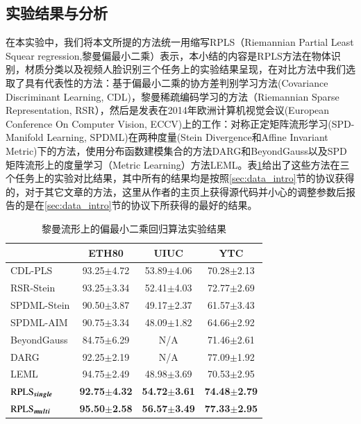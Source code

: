 \subsection{实验结果与分析}
\label{sec:RPLS_exp_result_analysis}
在本实验中，我们将本文所提的方法统一用缩写RPLS（Riemannian Partial Least Squear regression,黎曼偏最小二乘）表示，本小结的内容是RPLS方法在物体识别，材质分类以及视频人脸识别三个任务上的实验结果呈现，在对比方法中我们选取了具有代表性的方法：基于偏最小二乘的协方差判别学习方法(Covariance Discriminant Learning, CDL)\cite{Statistics_CDL}，黎曼稀疏编码学习的方法（Riemannian Sparse Representation, RSR\cite{Dictionary_RSR}），然后是发表在2014年欧洲计算机视觉会议(European Conference On Computer Vision, ECCV)上的工作：对称正定矩阵流形学习(SPD-Manifold Learning, SPDML\cite{Statistics_SPDML})在两种度量(Stein Divergence\cite{Stein_divergence}和Affine Invariant Metric\cite{AIM_metric})下的方法，使用分布函数建模集合的方法DARG\cite{Statistics_DARG}和BeyondGauss\cite{Statistics_BeyondGauss}以及SPD矩阵流形上的度量学习（Metric Learning）方法LEML\cite{Statistics_LEML}。表\ref{tab:RPLS_experiment}给出了这些方法在三个任务上的实验对比结果，其中所有的结果均是按照\ref{sec:data_intro}节的协议获得的，对于其它文章的方法，这里从作者的主页上获得源代码并小心的调整参数后报告的是在\ref{sec:data_intro}节的协议下所获得的最好的结果。
\begin{table}[htb]
	\centering
	\caption{黎曼流形上的偏最小二乘回归算法实验结果}
	\begin{tabular*}{\linewidth}{@{\extracolsep{\fill}}|l|ccc|}\hline
		\diagbox{方法}{数据集} &ETH80 &UIUC &YTC \\ \hline
		CDL-PLS\cite{Statistics_CDL} &93.25$\pm$4.72 &53.89$\pm$4.06 &70.28$\pm$2.13 \\ \hline
		RSR-Stein\cite{Dictionary_RSR} &93.25$\pm$3.34 &52.41$\pm$4.03 &72.77$\pm$2.69  \\ \hline
		SPDML-Stein\cite{Statistics_SPDML} &90.50$\pm$3.87 &49.17$\pm$2.37 &61.57$\pm$3.43  \\ \hline
		SPDML-AIM\cite{Statistics_SPDML} &90.75$\pm$3.34 &48.09$\pm$1.82 &64.66$\pm$2.92  \\ \hline
		BeyondGauss\cite{Statistics_BeyondGauss} &84.75$\pm$6.29 &N/A &71.46$\pm$2.61  \\ \hline
		DARG\cite{Statistics_DARG} &92.25$\pm$2.19 &N/A &77.09$\pm$1.92  \\ \hline
		LEML\cite{Statistics_LEML}&94.75$\pm$2.49 &48.98$\pm$3.69 &70.53$\pm$2.95  \\ \hline
		$\rm \bm{RPLS_{single}}$ &\textbf{92.75$\pm$4.32} &\textbf{54.72$\pm$3.61} &\textbf{74.48$\pm$2.79}  \\ \hline
		$\rm \bm{RPLS_{multi}}$ &\textbf{95.50$\pm$2.58} &\textbf{56.57$\pm$3.49} &\textbf{77.33$\pm$2.95}  \\ \hline
	\end{tabular*}
	\label{tab:RPLS_experiment}
\end{table}

